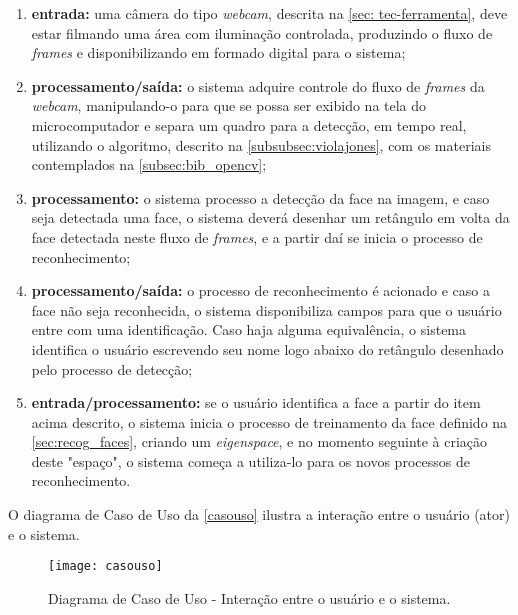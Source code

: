 \begin{enumerate}
	\item \textbf{entrada:} uma câmera do tipo \textit{webcam}, descrita na \autoref{sec: tec-ferramenta}, deve estar filmando uma área com iluminação controlada, produzindo o fluxo de \textit{frames} e disponibilizando em formado digital para o sistema;
	
	\item \textbf{processamento/saída:} o sistema adquire controle do fluxo de \textit{frames} da \textit{webcam}, manipulando-o para que se possa ser exibido na tela do microcomputador e separa um quadro para a detecção, em tempo real, utilizando o algoritmo, descrito na \autoref{subsubsec:violajones}, com os materiais contemplados na \autoref{subsec:bib_opencv};
	
	\item \textbf{processamento:} o sistema processo a detecção da face na imagem, e caso seja detectada uma face, o sistema deverá desenhar um retângulo em volta da face detectada neste fluxo de \textit{frames}, e a partir daí se inicia o processo de reconhecimento;
	
	\item \textbf{processamento/saída:} o processo de reconhecimento é acionado e caso a face não seja reconhecida, o sistema disponibiliza campos para que o usuário entre com uma identificação. Caso haja alguma equivalência, o sistema identifica o usuário escrevendo seu nome logo abaixo do retângulo desenhado pelo processo de detecção;
	
	\item \textbf{entrada/processamento:} se o usuário identifica a face a partir do item acima descrito, o sistema inicia o processo de treinamento da face definido na \autoref{sec:recog_faces}, criando um \textit{eigenspace}, e no momento seguinte à criação deste "espaço", o sistema começa a utiliza-lo para os novos processos de reconhecimento.
\end{enumerate}

O diagrama de Caso de Uso da \autoref{casouso} ilustra a interação entre o usuário (ator) e o sistema.


\begin{figure}[h]
	\centering
	\texttt{[image: casouso]}
	\caption{Diagrama de Caso de Uso - Interação entre o usuário e o sistema.}
	\label{casouso}
\end{figure}







